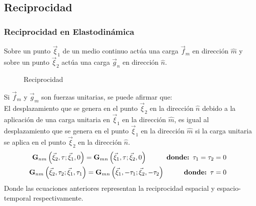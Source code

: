 \documentclass{beamer}
\begin{document}
\subsection{Reciprocidad}
\begin{frame}[allowframebreaks]
\frametitle{Reciprocidad en Elastodinámica}
%
\justifying
%
Sobre un punto $\vec{\xi}_1$ de un medio continuo actúa una carga $\vec{f}_m$ en dirección $\hat{m}$ y sobre un punto $\vec{\xi}_2$ actúa una carga $\vec{g}_n$ en dirección $\hat{n}$.
%
\begin{figure}[h]
\centering
%
	\caption{Reciprocidad}
%
\end{figure}
%
Si $\vec{f}_m$ y $\vec{g}_m$ son fuerzas unitarias, se puede afirmar que:\\
%
El desplazamiento que se genera en el punto $\vec{\xi}_2$ en la dirección $\hat{n}$ debido a la aplicación de una carga unitaria en $\vec{\xi}_1$ en la dirección $\hat{m}$, es igual al desplazamiento que se genera en el punto $\vec{\xi}_1$ en la dirección $\hat{m}$ si la carga unitaria se aplica en el punto $\vec{\xi}_2$ en la dirección $\hat{n}$.
%
\begin{align*}
	\mathbf{G}_{nm} \left( \vec{\xi}_2, \tau ; \vec{\xi}_1, 0 \right)  = \mathbf{G}_{mn} \left( \vec{\xi}_1, \tau ; \vec{\xi}_2, 0 \right) \hspace{1 cm} \textbf{donde: $\tau_1=\tau_2=0$}\\
	\mathbf{G}_{nm} \left( \vec{\xi}_2, \tau_2 ; \vec{\xi}_1, \tau_1 \right)  = \mathbf{G}_{mn} \left( \vec{\xi}_1, -\tau_1 ; \vec{\xi}_2, -\tau_2 \right) \hspace{1 cm} \textbf{donde: $\tau=0$}
\end{align*}
%
Donde las ecuaciones anteriores representan la reciprocidad espacial y espacio-temporal respectivamente.
%
%
\end{frame}
%
%
\end{document}
